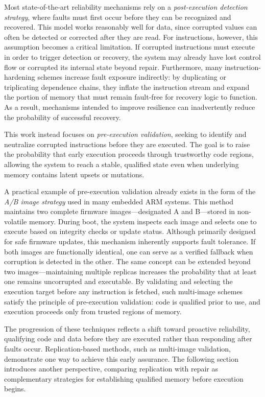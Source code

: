 Most state-of-the-art reliability mechanisms rely on a \emph{post-execution detection strategy}, where faults must first occur before they can be recognized and recovered. This model works reasonably well for data, since corrupted values can often be detected or corrected after they are read. For instructions, however, this assumption becomes a critical limitation. If corrupted instructions must execute in order to trigger detection or recovery, the system may already have lost control flow or corrupted its internal state beyond repair. Furthermore, many instruction-hardening schemes increase fault exposure indirectly: by duplicating or triplicating dependence chains, they inflate the instruction stream and expand the portion of memory that must remain fault-free for recovery logic to function. As a result, mechanisms intended to improve resilience can inadvertently reduce the probability of successful recovery.

This work instead focuses on \emph{pre-execution validation}, seeking to identify and neutralize corrupted instructions before they are executed. The goal is to raise the probability that early execution proceeds through trustworthy code regions, allowing the system to reach a stable, qualified state even when underlying memory contains latent upsets or mutations.

A practical example of pre-execution validation already exists in the form of the \emph{A/B image strategy} used in many embedded ARM systems. This method maintains two complete firmware images—designated A and B—stored in non-volatile memory. During boot, the system inspects each image and selects one to execute based on integrity checks or update status. Although primarily designed for safe firmware updates, this mechanism inherently supports fault tolerance. If both images are functionally identical, one can serve as a verified fallback when corruption is detected in the other. The same concept can be extended beyond two images—maintaining multiple replicas increases the probability that at least one remains uncorrupted and executable. By validating and selecting the execution target before any instruction is fetched, such multi-image schemes satisfy the principle of pre-execution validation: code is qualified prior to use, and execution proceeds only from trusted regions of memory.

The progression of these techniques reflects a shift toward proactive reliability, qualifying code and data before they are executed rather than responding after faults occur. Replication-based methods, such as multi-image validation, demonstrate one way to achieve this early assurance. The following section introduces another perspective, comparing replication with repair as complementary strategies for establishing qualified memory before execution begins.

